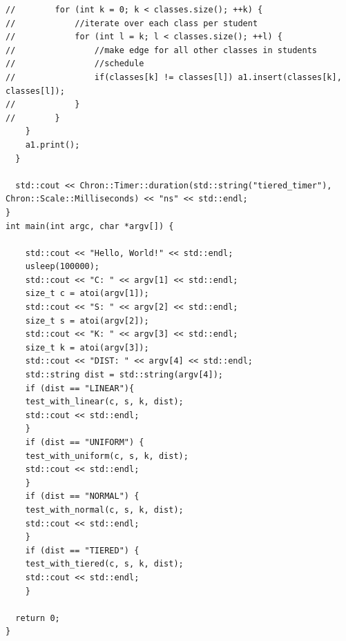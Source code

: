 \documentclass[11pt]{article}
\begin{document}
\begin{verbatim}
//        for (int k = 0; k < classes.size(); ++k) {
//            //iterate over each class per student
//            for (int l = k; l < classes.size(); ++l) {
//                //make edge for all other classes in students
//                //schedule
//                if(classes[k] != classes[l]) a1.insert(classes[k], classes[l]);
//            }
//        }
    }
    a1.print();
  }

  std::cout << Chron::Timer::duration(std::string("tiered_timer"), Chron::Scale::Milliseconds) << "ns" << std::endl;
}
int main(int argc, char *argv[]) {

    std::cout << "Hello, World!" << std::endl;
    usleep(100000);
    std::cout << "C: " << argv[1] << std::endl;
    size_t c = atoi(argv[1]);
    std::cout << "S: " << argv[2] << std::endl;
    size_t s = atoi(argv[2]);
    std::cout << "K: " << argv[3] << std::endl;
    size_t k = atoi(argv[3]);
    std::cout << "DIST: " << argv[4] << std::endl;
    std::string dist = std::string(argv[4]);
    if (dist == "LINEAR"){ 
    test_with_linear(c, s, k, dist);
    std::cout << std::endl;
    }
    if (dist == "UNIFORM") {
    test_with_uniform(c, s, k, dist);
    std::cout << std::endl;
    }
    if (dist == "NORMAL") {
    test_with_normal(c, s, k, dist);
    std::cout << std::endl;
    }
    if (dist == "TIERED") {
    test_with_tiered(c, s, k, dist);
    std::cout << std::endl;
    }

  return 0;
}
\end{verbatim}
\end{document}
